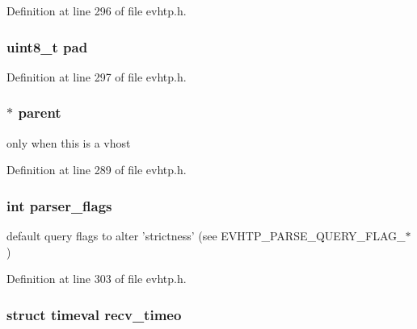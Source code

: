 Definition at line 296 of file evhtp.\-h.

\hypertarget{structevhtp__s_ac1a86b4f13c0cf801df27e12ce75f046}{
\subsubsection[{pad}]{\setlength{\rightskip}{0pt plus 5cm}uint8\-\_\-t pad}}\label{structevhtp__s_ac1a86b4f13c0cf801df27e12ce75f046}


Definition at line 297 of file evhtp.\-h.

\hypertarget{structevhtp__s_adff9fa3bd346936d706e1a30c3bf4ca1}{
\subsubsection[{parent}]{$\ast$ parent}}\label{structevhtp__s_adff9fa3bd346936d706e1a30c3bf4ca1}
only when this is a vhost 

Definition at line 289 of file evhtp.\-h.

\hypertarget{structevhtp__s_ad4fd469906d549a4621db759d7f214ca}{
\subsubsection[{parser\-\_\-flags}]{\setlength{\rightskip}{0pt plus 5cm}int parser\-\_\-flags}}\label{structevhtp__s_ad4fd469906d549a4621db759d7f214ca}
default query flags to alter 'strictness' (see E\-V\-H\-T\-P\-\_\-\-P\-A\-R\-S\-E\-\_\-\-Q\-U\-E\-R\-Y\-\_\-\-F\-L\-A\-G\-\_\-$\ast$) 

Definition at line 303 of file evhtp.\-h.

\hypertarget{structevhtp__s_a485801666b7fb0cccc50d9fa42e5cbb9}{
\subsubsection[{recv\-\_\-timeo}]{\setlength{\rightskip}{0pt plus 5cm}struct timeval recv\-\_\-timeo}}\label{structevhtp__s_a485801666b7fb0cccc50d9fa42e5cbb9}


